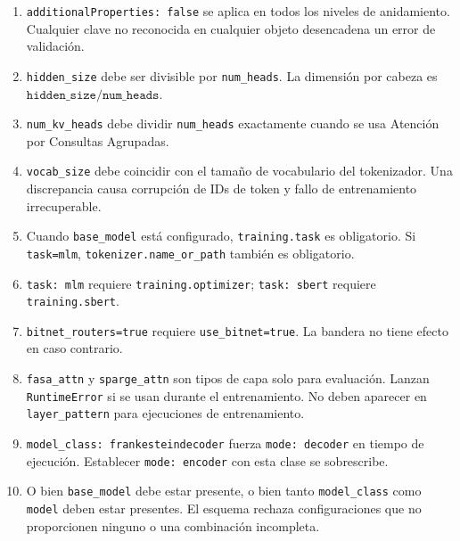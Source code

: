 \begin{enumerate}[nosep]
    \item \texttt{additionalProperties: false} se aplica en todos los niveles de anidamiento. Cualquier clave no reconocida en cualquier objeto desencadena un error de validación.
    \item \texttt{hidden\_size} debe ser divisible por \texttt{num\_heads}. La dimensión por cabeza es $\texttt{hidden\_size} / \texttt{num\_heads}$.
    \item \texttt{num\_kv\_heads} debe dividir \texttt{num\_heads} exactamente cuando se usa Atención por Consultas Agrupadas.
    \item \texttt{vocab\_size} debe coincidir con el tamaño de vocabulario del tokenizador. Una discrepancia causa corrupción de IDs de token y fallo de entrenamiento irrecuperable.
    \item Cuando \texttt{base\_model} está configurado, \texttt{training.task} es obligatorio. Si \texttt{task=mlm}, \texttt{tokenizer.name\_or\_path} también es obligatorio.
    \item \texttt{task: mlm} requiere \texttt{training.optimizer}; \texttt{task: sbert} requiere \texttt{training.sbert}.
    \item \texttt{bitnet\_routers=true} requiere \texttt{use\_bitnet=true}. La bandera no tiene efecto en caso contrario.
    \item \texttt{fasa\_attn} y \texttt{sparge\_attn} son tipos de capa solo para evaluación. Lanzan \texttt{RuntimeError} si se usan durante el entrenamiento. No deben aparecer en \texttt{layer\_pattern} para ejecuciones de entrenamiento.
    \item \texttt{model\_class: frankesteindecoder} fuerza \texttt{mode: decoder} en tiempo de ejecución. Establecer \texttt{mode: encoder} con esta clase se sobrescribe.
    \item O bien \texttt{base\_model} debe estar presente, o bien tanto \texttt{model\_class} como \texttt{model} deben estar presentes. El esquema rechaza configuraciones que no proporcionen ninguno o una combinación incompleta.
\end{enumerate}
